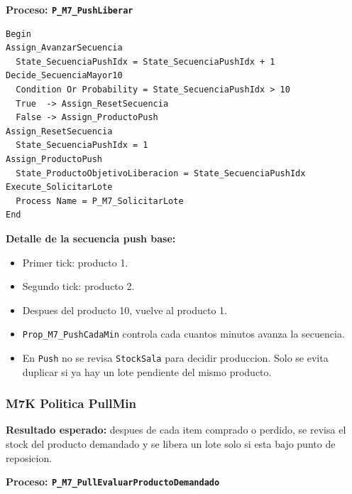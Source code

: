 \documentclass[11pt]{article}
\newcommand{\simio}[1]{\texttt{#1}}
\newcommand{\state}[1]{\texttt{#1}}
\newcommand{\proc}[1]{\texttt{#1}}
\begin{document}
\textbf{Proceso: \proc{P\_M7\_PushLiberar}}

\begin{lstlisting}[caption={Bloques de P M7 PushLiberar}]
Begin
Assign_AvanzarSecuencia
  State_SecuenciaPushIdx = State_SecuenciaPushIdx + 1
Decide_SecuenciaMayor10
  Condition Or Probability = State_SecuenciaPushIdx > 10
  True  -> Assign_ResetSecuencia
  False -> Assign_ProductoPush
Assign_ResetSecuencia
  State_SecuenciaPushIdx = 1
Assign_ProductoPush
  State_ProductoObjetivoLiberacion = State_SecuenciaPushIdx
Execute_SolicitarLote
  Process Name = P_M7_SolicitarLote
End
\end{lstlisting}

\textbf{Detalle de la secuencia push base:}
\begin{itemize}
  \item Primer tick: producto 1.
  \item Segundo tick: producto 2.
  \item Despues del producto 10, vuelve al producto 1.
  \item \state{Prop\_M7\_PushCadaMin} controla cada cuantos minutos avanza la secuencia.
  \item En \simio{Push} no se revisa \state{StockSala} para decidir produccion. Solo se evita duplicar si ya hay un lote pendiente del mismo producto.
\end{itemize}

\subsubsection{M7K Politica PullMin}
\textbf{Resultado esperado:} despues de cada item comprado o perdido, se revisa el stock del producto demandado y se libera un lote solo si esta bajo punto de reposicion.

\textbf{Proceso: \proc{P\_M7\_PullEvaluarProductoDemandado}}
\end{document}
